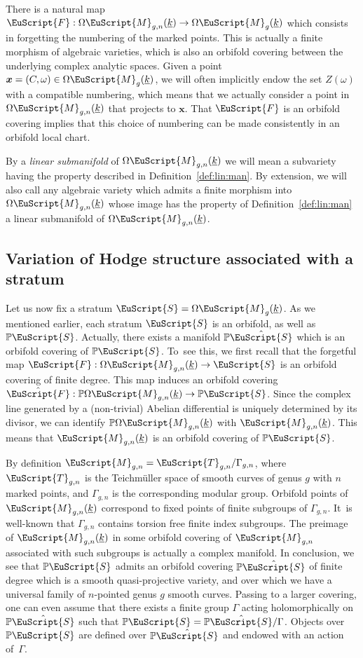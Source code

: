 \documentclass[10pt]{amsart}
\let\mathcal\EuScript
\theoremstyle{plain}
\theoremstyle{definition}
\newcommand{\Pb}{\mathbb{P}}
\newcommand{\xx}{\boldsymbol{x}}
\newcommand{\Fcal}{\mathcal{F}}
\newcommand{\Mcal}{\mathcal{M}}
\newcommand{\Tcal}{\mathcal{T}}
\newcommand{\cM}{\mathcal{M}}
\newcommand{\cS}{\mathcal{S}}
\let\G\Gamma
\let\omg\omega
\let\ul\underline
\let\ra\to
\newcommand{\trate}{\Omega\Mcal_{g}(\ul{k})}
\begin{document}
There is a natural map $\Fcal: \Omega\cM_{g,n}(\ul{k}) \to \trate$ which consists in forgetting the numbering of the marked points.
This is actually a finite morphism of algebraic varieties, which is also an orbifold covering between the underlying complex analytic spaces.
Given a point $\xx=(C,\omg) \in \trate$, we will often implicitly endow the set $Z(\omg)$ with a compatible numbering, which means that we actually consider a point in $\Omega\cM_{g,n}(\ul{k})$ that projects to $\xx$.
That $\Fcal$ is an orbifold covering implies that this choice of numbering can be made consistently in an orbifold local chart.

By a \emph{linear submanifold} of $\Omega\cM_{g,n}(\ul{k})$ we will mean a subvariety having the property described in Definition~\ref{def:lin:man}.
By extension, we will also call any algebraic variety which admits a finite morphism into $\Omega\cM_{g,n}(\ul{k})$ whose image has the property of Definition~\ref{def:lin:man} a linear submanifold of $\Omega\cM_{g,n}(\ul{k})$.\enlargethispage{.5\baselineskip}%

\subsection{Variation of Hodge structure associated with a stratum}\label{subsec:VMHS}
Let us now fix a stratum $\cS=\trate$. As we mentioned earlier, each stratum $\cS$ is an orbifold, as well as $\Pb\cS$. Actually, there exists a manifold $\Pb\hat\cS$ which is an orbifold covering of $\Pb\cS$.
To~see this, we first recall that the forgetful map $\Fcal: \Omega\cM_{g,n}(\ul{k}) \ra\nobreak \cS$ is an orbifold covering of finite degree. This map induces an orbifold covering $\hat{\Fcal}: \Pb\Omega\cM_{g,n}(\ul{k}) \to \Pb\cS$. Since the complex line generated by a (non-trivial) Abelian differential is uniquely determined by its divisor, we can identify $\Pb\Omega\cM_{g,n}(\ul{k})$ with $\cM_{g,n}(\ul{k})$. This means that $\cM_{g,n}(\ul{k})$ is an orbifold covering of $\Pb\cS$.

By definition $\cM_{g,n}=\Tcal_{g,n}/\G_{g,n}$, where $\Tcal_{g,n}$ is the Teichmüller space of smooth curves of genus $g$ with $n$ marked points, and $\G_{g,n}$ is the corresponding modular group. Orbifold points of $\cM_{g,n}(\ul{k})$ correspond to fixed points of finite subgroups of $\G_{g,n}$. It~is well-known that $\G_{g,n}$ contains torsion free finite index subgroups. The preimage of $\cM_{g,n}(\ul{k})$ in some orbifold covering of $\cM_{g,n}$ associated with such subgroups is actually a complex manifold. In conclusion, we see that $\Pb\cS$ admits an orbifold covering $\Pb\hat{\cS}$ of finite degree which is a smooth quasi-projective variety, and over which we have a universal family of $n$-pointed genus $g$ smooth curves.
Passing to a larger covering, one can even assume that there exists a finite group $\Gamma$ acting holomorphically on $\Pb\hat\cS$ such that $\Pb\cS=\Pb\hat\cS/\Gamma$.
Objects over $\Pb\cS$ are defined over $\Pb\hat\cS$ and endowed with an action of~$\Gamma$.
\end{document}
